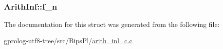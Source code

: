 \subsubsection[{\texorpdfstring{f\+\_\+n}{f_n}}]{ Arith\+Inf\+::f\+\_\+n}\hypertarget{structArithInf_a0adf57977998badbf4fa7d8386fd5bdc}{}\label{structArithInf_a0adf57977998badbf4fa7d8386fd5bdc}


The documentation for this struct was generated from the following file\+:\begin{DoxyCompactItemize}
\item 
gprolog-\/utf8-\/tree/src/\+Bips\+Pl/\hyperlink{arith__inl__c_8c}{arith\+\_\+inl\+\_\+c.\+c}\end{DoxyCompactItemize}
